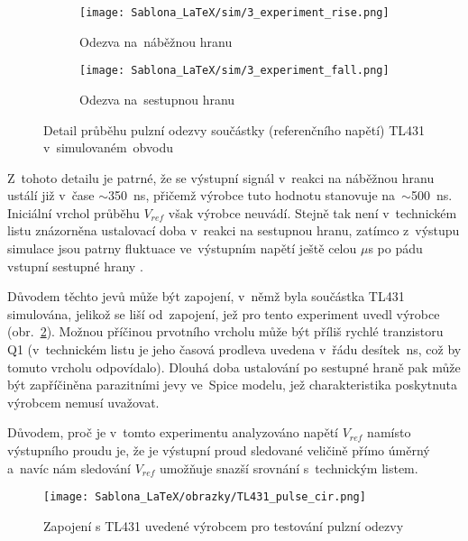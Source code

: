 \documentclass[12pt]{CLASS/protokol}
\begin{document}
        \begin{figure}[hb!]
            \centering
            \begin{subfigure}[b]{0.45\textwidth}
                \texttt{[image: Sablona\_LaTeX/sim/3\_experiment\_rise.png]}
                \caption{Odezva na~náběžnou hranu}
            \end{subfigure}
            \begin{subfigure}[b]{0.45\textwidth}
                \texttt{[image: Sablona\_LaTeX/sim/3\_experiment\_fall.png]}
                \caption{Odezva na~sestupnou hranu}
            \end{subfigure}
            \caption{Detail průběhu pulzní odezvy součástky (referenčního napětí) TL431 v~simulovaném~obvodu \cite{pspice}}
            \label{fig:pulse_min_detail}
        \end{figure}
        
        \newpage
        
        \par
        Z~tohoto detailu je patrné, že se výstupní signál v~reakci na náběžnou hranu ustálí již v~čase $\sim$350~ns, přičemž výrobce tuto hodnotu stanovuje na~$\sim$500~ns. Iniciální vrchol průběhu $V_{ref}$ však výrobce neuvádí. Stejně tak není v~technickém listu znázorněna ustalovací doba v~reakci na sestupnou hranu, zatímco z~výstupu simulace jsou patrny fluktuace ve~výstupním napětí ještě celou $\mu$s po pádu vstupní sestupné hrany \cite{TI_TL431_datasheet}.
        \par
        Důvodem těchto jevů může být zapojení, v~němž byla součástka TL431 simulována, jelikož se liší od~zapojení, jež pro tento experiment uvedl výrobce (obr.~\ref{fig:TL431_pulse_cir}). Možnou příčinou prvotního vrcholu může být příliš rychlé  tranzistoru Q1 (v~technickém listu je jeho časová prodleva uvedena v~řádu desítek~ns, což by tomuto vrcholu odpovídalo). Dlouhá doba ustalování po sestupné hraně pak může být zapříčiněna parazitními jevy ve~Spice modelu, jež charakteristika poskytnuta výrobcem nemusí uvažovat.
        \par
        Důvodem, proč je v~tomto experimentu analyzováno napětí $V_{ref}$ namísto výstupního proudu je, že je výstupní proud sledované veličině přímo úměrný a~navíc nám sledování $V_{ref}$ umožňuje snazší srovnání s~technickým listem.
        
        \begin{figure}[h]
            \centering
            \texttt{[image: Sablona\_LaTeX/obrazky/TL431\_pulse\_cir.png]}
            \caption{Zapojení s TL431 uvedené výrobcem pro testování pulzní odezvy \cite{TI_TL431_datasheet}}
            \label{fig:TL431_pulse_cir}
        \end{figure}
        
\end{document}
